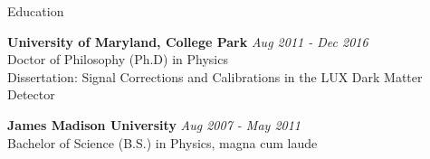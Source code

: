 \documentclass{resume} %
\begin{document}

\begin{rSection}{Education}

{\bf University of Maryland, College Park} \hfill {\em Aug 2011 - Dec 2016} \\ 
Doctor of Philosophy (Ph.D) in Physics \\
Dissertation: Signal Corrections and Calibrations in the LUX Dark Matter Detector

{\bf James Madison University} \hfill {\em Aug 2007 - May 2011} \\ 
Bachelor of Science (B.S.) in Physics, magna cum laude \\



\end{rSection}

\end{document}
